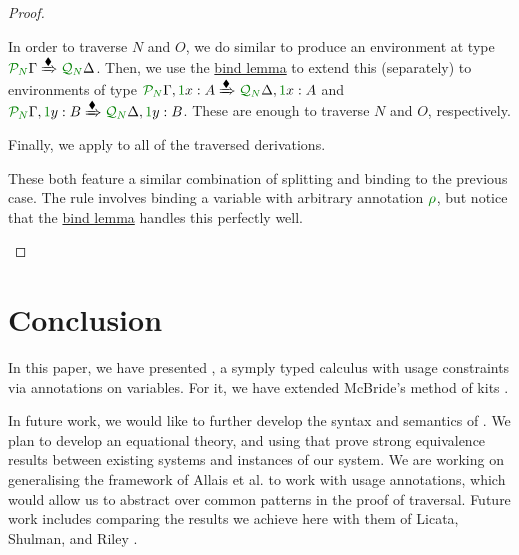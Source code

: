 \documentclass[submission,copyright,creativecommons]{eptcs}
\begin{document}
\begin{proof}
\begin{description}
      In order to traverse $N$ and $O$, we do similar to produce an environment
      at type
      $\ctx{\Gamma}{P_{\mathnormal N}}
      \subst{\kitrel} \ctx{\Delta}{Q_{\mathnormal N}}$.
      Then, we use the \hyperref[lem:bind]{bind lemma} to extend this
      (separately) to environments of type
      $\ctx{\Gamma}{P_{\mathnormal N}}, \ctxvar{x}{A}{1}
      \subst{\kitrel} \ctx{\Delta}{Q_{\mathnormal N}}, \ctxvar{x}{A}{1}$ and
      $\ctx{\Gamma}{P_{\mathnormal N}}, \ctxvar{y}{B}{1}
      \subst{\kitrel} \ctx{\Delta}{Q_{\mathnormal N}}, \ctxvar{y}{B}{1}$.
      These are enough to traverse $N$ and $O$, respectively.

      Finally, we apply  to all of the traversed
      derivations.
    \item[\TirName{$\tensor{}{}$-E}, \TirName{$\excl{\rho}{}$-E}:]
      These both feature a similar combination of splitting and binding to the
      previous case.
      The  rule involves binding a variable with
      arbitrary annotation $\rescomment\rho$, but notice that the
      \hyperref[lem:bind]{bind lemma} handles this perfectly well.
  \end{description}
\end{proof}

\section{Conclusion}\label{sec:conclusion}

In this paper, we have presented \name{}, a symply typed calculus with usage
constraints via annotations on variables.
For it, we have extended McBride's method of kits \cite{rensub05}.

In future work, we would like to further develop the syntax and semantics of
\name{}.
We plan to develop an equational theory, and using that prove strong equivalence
results between existing systems and instances of our system.
We are working on generalising the framework of Allais et al. \cite{AACMM20} to
work with usage annotations, which would allow us to abstract over common
patterns in the proof of traversal.
Future work includes comparing the results we achieve here with them of Licata,
Shulman, and Riley \cite{LicataSR17}.



\end{document}
